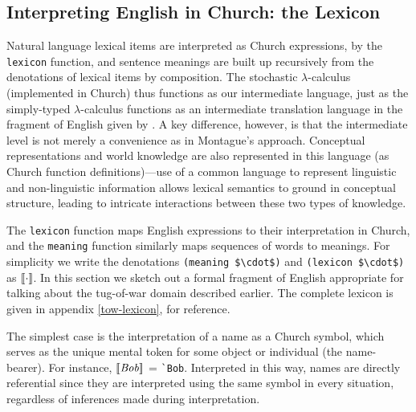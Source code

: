 \documentclass[pdfextras]{handbook}
\newcommand{\llbracket}{\ensuremath{\left [\!\left [}}%
\newcommand{\rrbracket}{\ensuremath{\right ]\!\right ]}}
\newcommand{\denot}[1]{\ensuremath{\llbracket \mathit{#1} \rrbracket}}
\begin{document}
\subsection{Interpreting English in Church: the Lexicon}
\label{lexicon}
Natural language lexical items are interpreted as Church expressions, by the \lstinline{lexicon} function, and sentence meanings are built up recursively from the denotations of lexical items by composition. 
%
The stochastic $\lambda$-calculus (implemented in Church) thus functions as our intermediate language, just as the simply-typed $\lambda$-calculus functions as an intermediate translation language in the fragment of English given by \citet{montague1973}. 
A key difference, however, is that the intermediate level is not merely a convenience as in Montague's approach. 
Conceptual representations and world knowledge are also represented in this language (as Church function definitions)---use of a common language to represent linguistic and non-linguistic information allows lexical semantics to ground in conceptual structure, leading to intricate interactions between these two types of knowledge. 

The \lstinline{lexicon} function maps English expressions to their interpretation in Church, and the \lstinline{meaning} function similarly maps sequences of words to meanings.
For simplicity we write the denotations \lstinline[mathescape]{(meaning $\cdot$)} and \lstinline[mathescape]{(lexicon $\cdot$)} as \denot{\cdot}. In this section we sketch out a formal fragment of English appropriate for talking about the tug-of-war domain described earlier. The complete lexicon is given in appendix \ref{tow-lexicon}, for reference.

The simplest case is the interpretation of a name as a Church symbol, which serves as the unique mental token for some object or individual (the name-bearer). For instance, \denot{Bob} = \lstinline{`Bob}.
Interpreted in this way, names are directly referential since they are interpreted using the same symbol in every situation, regardless of inferences made during interpretation. 
\end{document}
